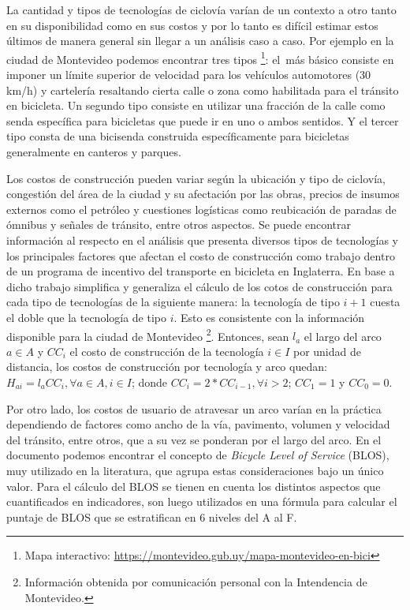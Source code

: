 La cantidad y tipos de tecnologías de ciclovía varían de un contexto a otro tanto en su disponibilidad como en sus costos y por lo tanto es difícil estimar estos últimos de manera general sin llegar a un análisis caso a caso. Por ejemplo en la ciudad de Montevideo podemos encontrar tres tipos \footnote{Mapa interactivo: \url{https://montevideo.gub.uy/mapa-montevideo-en-bici}}: el más básico consiste en imponer un límite superior de velocidad para los vehículos automotores (30 km/h) y cartelería resaltando cierta calle o zona como habilitada para el tránsito en bicicleta. Un segundo tipo consiste en utilizar una fracción de la calle como senda específica para bicicletas que puede ir en uno o ambos sentidos. Y el tercer tipo consta de una bicisenda construida específicamente para bicicletas generalmente en canteros y parques.

Los costos de construcción pueden variar según la ubicación y tipo de ciclovía, congestión del área de la ciudad y su afectación por las obras, precios de insumos externos como el petróleo y cuestiones logísticas como reubicación de paradas de ómnibus y señales de tránsito, entre otros aspectos. Se puede encontrar información al respecto en el análisis \cite{typicalcostsofcylcing} que presenta diversos tipos de tecnologías y los principales factores que afectan el costo de construcción como trabajo dentro de un programa de incentivo del transporte en bicicleta en Inglaterra. En base a dicho trabajo \cite{baya2021} simplifica y generaliza el cálculo de los cotos de construcción para cada tipo de tecnologías de la siguiente manera: la tecnología de tipo $i + 1$ cuesta el doble que la tecnología de tipo $i$. Esto es consistente con la información disponible para la ciudad de Montevideo \footnote{Información obtenida por comunicación personal con la Intendencia de Montevideo.}. Entonces, sean $l_a$ el largo del arco $a \in A$ y $CC_i$ el costo de construcción de la tecnología $i \in I$ por unidad de distancia, los costos de construcción por tecnología y arco quedan: $H_{ai} = l_a CC_i, \forall a \in A, i \in I$; donde $CC_i = 2 * CC_{i-1}, \forall i > 2$; $CC_1 = 1$ y $CC_0 = 0$.

Por otro lado, los costos de usuario de atravesar un arco varían en la práctica dependiendo de factores como ancho de la vía, pavimento, volumen y velocidad del tránsito, entre otros, que a su vez se ponderan por el largo del arco. En el documento \cite{blos2007} podemos encontrar el concepto de {\it Bicycle Level of Service} (BLOS), muy utilizado en la literatura, que agrupa estas consideraciones bajo un único valor. Para el cálculo del BLOS se tienen en cuenta los distintos aspectos que cuantificados en indicadores, son luego utilizados en una fórmula para calcular el puntaje de BLOS que se estratifican en 6 niveles del A al F.

